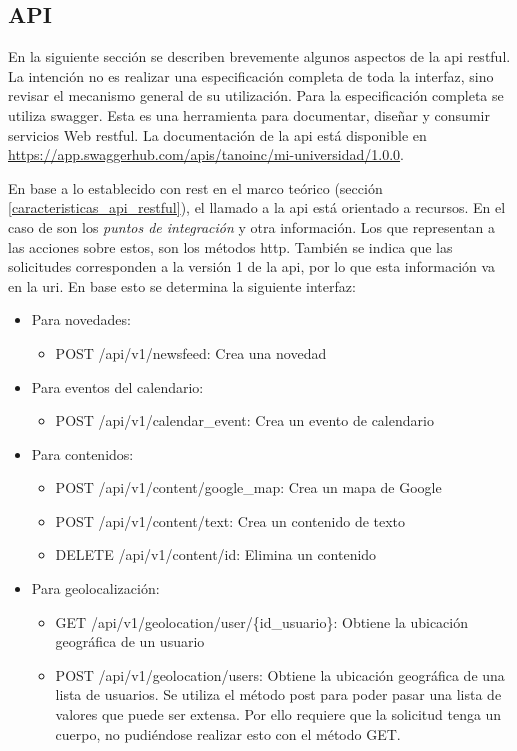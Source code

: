 \subsection{API}
\label{funcionalidad_noticias_api}

En la siguiente sección se describen brevemente algunos aspectos de la \gls{api} \gls{restful}. La intención no es realizar una especificación completa de toda la interfaz, sino revisar el mecanismo general de su utilización. Para la especificación completa se utiliza \gls{swagger}. Esta es una herramienta para documentar, diseñar y consumir servicios Web \gls{restful}. La documentación de la \gls{api} está disponible en \url{https://app.swaggerhub.com/apis/tanoinc/mi-universidad/1.0.0}.

En base a lo establecido con \gls{rest} en el marco teórico (sección \ref{caracteristicas_api_restful}), el llamado a la \gls{api} está orientado a recursos. En el caso de \nombreApp{} son los \textit{puntos de integración} y otra información. Los  que representan a las acciones sobre estos, son los métodos \gls{http}. También se indica que las solicitudes corresponden a la versión 1 de la \gls{api}, por lo que esta información va en la \gls{uri}. En base esto se determina la siguiente interfaz:

\begin{itemize}
\item Para novedades:
\begin{itemize}
\item POST /api/v1/newsfeed: Crea una novedad
\end{itemize}
\item Para eventos del calendario:
\begin{itemize}
\item POST /api/v1/calendar\_event: Crea un evento de calendario
\end{itemize}
\item Para contenidos:
\begin{itemize}
\item POST /api/v1/content/google\_map: Crea un mapa de Google
\item POST /api/v1/content/text: Crea un contenido de texto
\item DELETE /api/v1/content/{id}: Elimina un contenido
\end{itemize}
\item Para geolocalización:
\begin{itemize}
\item GET /api/v1/geolocation/user/\{id\_usuario\}: Obtiene la ubicación geográfica de un usuario
\item POST /api/v1/geolocation/users: Obtiene la ubicación geográfica de una lista de usuarios. Se utiliza el método post para poder pasar una lista de valores que puede ser extensa. Por ello requiere que la solicitud tenga un cuerpo, no pudiéndose realizar esto con el método GET.
\end{itemize}
\end{itemize}

